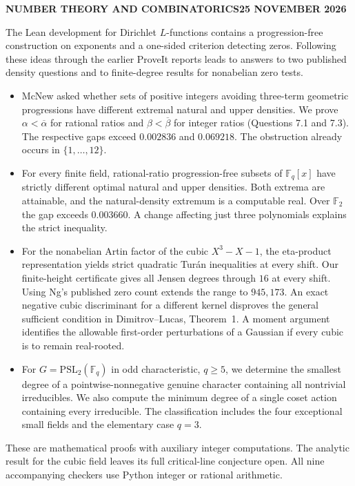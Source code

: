\documentclass[11pt,letterpaper]{article}
\begin{document}
\thispagestyle{plain}
{\sffamily\small\bfseries\color{ac}NUMBER THEORY AND COMBINATORICS\hfill 25 NOVEMBER 2026}\par\vspace{8pt}
\vspace{4pt}\noindent{\color{ac}\rule{\linewidth}{1pt}}

\noindent The Lean development for Dirichlet $L$-functions contains a progression-free construction on exponents and a one-sided criterion detecting zeros. Following these ideas through the earlier ProveIt reports leads to answers to two published density questions and to finite-degree results for nonabelian zero tests.
\begin{itemize}
\item McNew asked whether sets of positive integers avoiding three-term geometric progressions have different extremal natural and upper densities. We prove $\alpha<\overline\alpha$ for rational ratios and $\beta<\overline\beta$ for integer ratios (Questions 7.1 and 7.3). The respective gaps exceed $0.002836$ and $0.069218$. The obstruction already occurs in $\{1,\ldots,12\}$.
\item For every finite field, rational-ratio progression-free subsets of $\mathbb F_q[x]$ have strictly different optimal natural and upper densities. Both extrema are attainable, and the natural-density extremum is a computable real. Over $\mathbb F_2$ the gap exceeds $0.003660$. A change affecting just three polynomials explains the strict inequality.
\item For the nonabelian Artin factor of the cubic $X^3-X-1$, the eta-product representation yields strict quadratic Tur\'an inequalities at every shift. Our finite-height certificate gives all Jensen degrees through $16$ at every shift. Using Ng's published zero count extends the range to $945{,}173$. An exact negative cubic discriminant for a different kernel disproves the general sufficient condition in Dimitrov--Lucas, Theorem~1. A moment argument identifies the allowable first-order perturbations of a Gaussian if every cubic is to remain real-rooted.
\item For $G=\mathrm{PSL}_2(\mathbb F_q)$ in odd characteristic, $q\ge5$, we determine the smallest degree of a pointwise-nonnegative genuine character containing all nontrivial irreducibles. We also compute the minimum degree of a single coset action containing every irreducible. The classification includes the four exceptional small fields and the elementary case $q=3$.
\end{itemize}
These are mathematical proofs with auxiliary integer computations. The analytic result for the cubic field leaves its full critical-line conjecture open. All nine accompanying checkers use Python integer or rational arithmetic.
\end{document}
